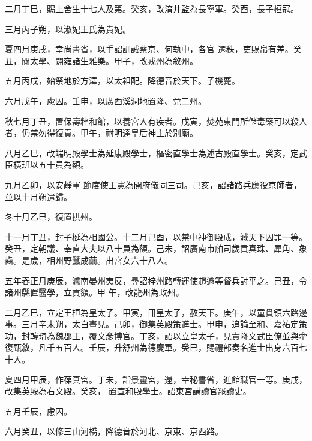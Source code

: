 \begin{pinyinscope}
 二月丁巳，賜上舍生十七人及第。癸亥，改淯井監為長寧軍。癸酉，長子桓冠。



 三月丙子朔，以淑妃王氏為貴妃。



 夏四月庚戌，幸尚書省，以手詔訓誡蔡京、何執中，各官
 遷秩，吏賜帛有差。癸丑，閱太學、闢雍諸生雅樂。甲子，改戎州為敘州。



 五月丙戌，始祭地於方澤，以太祖配。降德音於天下。子機薨。



 六月戊午，慮囚。壬申，以廣西溪洞地置隆、兌二州。



 秋七月丁丑，置保壽粹和館，以養宮人有疾者。戊寅，焚苑東門所儲毒藥可以殺人者，仍禁勿得復貢。甲午，祔明達皇后神主於別廟。



 八月乙巳，改端明殿學士為延康殿學士，樞密直學士為述古殿直學士。癸亥，定武臣橫班以五十員為額。



 九月乙卯，以安靜軍
 節度使王憲為開府儀同三司。己亥，詔諸路兵應役京師者，並以十月朔遣歸。



 冬十月乙巳，復置拱州。



 十一月丁丑，封子梴為相國公。十二月己酉，以禁中神御殿成，減天下囚罪一等。癸丑，定朝議、奉直大夫以八十員為額。己未，詔廣南市舶司歲貢真珠、犀角、象齒。是歲，相州野蠶成繭。出宮女六十八人。



 五年春正月庚辰，瀘南晏州夷反，尋詔梓州路轉運使趙遹等督兵討平之。己丑，令諸州縣置醫學，立貢額。甲
 午，改龍州為政州。



 二月乙巳，立定王桓為皇太子。甲寅，冊皇太子，赦天下。庚午，以童貫領六路邊事。三月辛未朔，太白晝見。己卯，御集英殿策進士。甲申，追論至和、嘉祐定策功，封韓琦為魏郡王，覆文彥博官。丁亥，詔以立皇太子，見責降文武臣僚並與牽復甄敘，凡千五百人。壬辰，升舒州為德慶軍。癸巳，賜禮部奏名進士出身六百七十人。



 夏四月甲辰，作葆真宮。丁未，詣景靈宮，還，幸秘書省，進館職官一等。庚戌，改集英殿為右文殿。癸亥，
 置宣和殿學士。詔東宮講讀官罷讀史。



 五月壬辰，慮囚。



 六月癸丑，以修三山河橋，降德音於河北、京東、京西路。




\end{pinyinscope}
